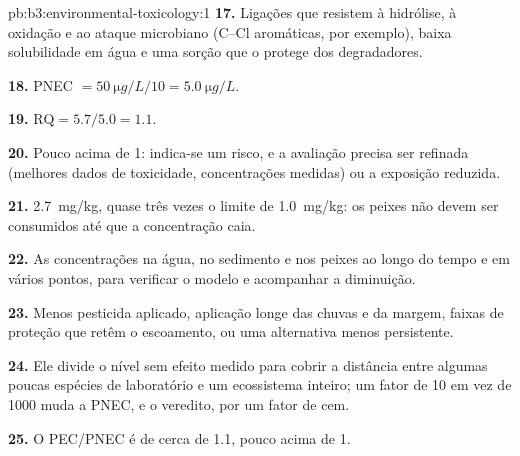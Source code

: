 \begin{solution}{pb:b3:environmental-toxicology:1}
\textbf{17.} Ligações que resistem à hidrólise, à oxidação e ao ataque microbiano (C--Cl
aromáticas, por exemplo), baixa solubilidade em água e uma sorção que o protege dos
degradadores.

\textbf{18.} PNEC $= \qty{50}{\micro g/L}/10 = \qty{5.0}{\micro g/L}$.

\textbf{19.} $\mathrm{RQ} = 5.7/5.0 = 1.1$.

\textbf{20.} Pouco acima de 1: indica-se um risco, e a avaliação precisa ser refinada (melhores
dados de toxicidade, concentrações medidas) ou a exposição reduzida.

\textbf{21.} \qty{2.7}{mg/kg}, quase três vezes o limite de \qty{1.0}{mg/kg}: os peixes não devem ser consumidos
até que a concentração caia.

\textbf{22.} As concentrações na água, no sedimento e nos peixes ao longo do tempo e em vários pontos,
para verificar o modelo e acompanhar a diminuição.

\textbf{23.} Menos pesticida aplicado, aplicação longe das chuvas e da margem,
faixas de proteção que retêm o escoamento, ou uma alternativa menos persistente.

\textbf{24.} Ele divide o nível sem efeito medido para cobrir a distância entre algumas poucas
espécies de laboratório e um ecossistema inteiro; um fator de 10 em vez de 1000 muda a
PNEC, e o veredito, por um fator de cem.

\textbf{25.} O  PEC/PNEC é de cerca de 1.1, pouco acima de 1.
\end{solution}
